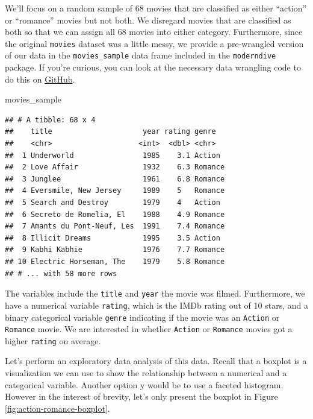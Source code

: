 \documentclass[
]{book}
\newenvironment{Shaded}{\begin{snugshade}}{\end{snugshade}}
\newcommand{\NormalTok}[1]{#1}
\begin{document}
We'll focus on a random sample of 68 movies that are classified as either ``action'' or ``romance'' movies but not both. We disregard movies that are classified as both so that we can assign all 68 movies into either category. Furthermore, since the original \texttt{movies} dataset was a little messy, we provide a pre-wrangled version of our data in the \texttt{movies\_sample} data frame included in the \texttt{moderndive} package. If you're curious, you can look at the necessary data wrangling code to do this on \href{https://github.com/moderndive/moderndive/blob/master/data-raw/process_data_sets.R\#L14}{GitHub}.

\begin{Shaded}
\begin{Highlighting}[]
\NormalTok{movies_sample}
\end{Highlighting}
\end{Shaded}

\begin{verbatim}
## # A tibble: 68 x 4
##    title                     year rating genre  
##    <chr>                    <int>  <dbl> <chr>  
##  1 Underworld                1985    3.1 Action 
##  2 Love Affair               1932    6.3 Romance
##  3 Junglee                   1961    6.8 Romance
##  4 Eversmile, New Jersey     1989    5   Romance
##  5 Search and Destroy        1979    4   Action 
##  6 Secreto de Romelia, El    1988    4.9 Romance
##  7 Amants du Pont-Neuf, Les  1991    7.4 Romance
##  8 Illicit Dreams            1995    3.5 Action 
##  9 Kabhi Kabhie              1976    7.7 Romance
## 10 Electric Horseman, The    1979    5.8 Romance
## # ... with 58 more rows
\end{verbatim}

The variables include the \texttt{title} and \texttt{year} the movie was filmed. Furthermore, we have a numerical variable \texttt{rating}, which is the IMDb rating out of 10 stars, and a binary categorical variable \texttt{genre} indicating if the movie was an \texttt{Action} or \texttt{Romance} movie. We are interested in whether \texttt{Action} or \texttt{Romance} movies got a higher \texttt{rating} on average.

Let's perform an exploratory data analysis of this data. Recall that a boxplot is a visualization we can use to show the relationship between a numerical and a categorical variable. Another option y would be to use a faceted histogram. However in the interest of brevity, let's only present the boxplot in Figure \ref{fig:action-romance-boxplot}.
\end{document}
